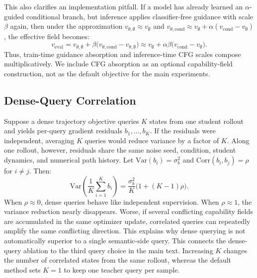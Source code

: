 \documentclass{llmxive}
\begin{document}
This also clarifies an implementation pitfall. If a model has already learned an $\alpha$-guided conditional branch, but inference applies classifier-free guidance with scale $\beta$ again, then under the approximation $v_{\theta,\emptyset}\approx v_{\emptyset}$ and $v_{\theta,\mathrm{cond}}\approx v_{\emptyset}+\alpha(v_{\mathrm{cond}}-v_{\emptyset})$, the effective field becomes:
\begin{equation}
  v_{\mathrm{eval}}
  =
  v_{\theta,\emptyset}
  +\beta\bigl(v_{\theta,\mathrm{cond}}-v_{\theta,\emptyset}\bigr)
  \approx
  v_{\emptyset}
  +\alpha\beta\bigl(v_{\mathrm{cond}}-v_{\emptyset}\bigr).
  \label{eq:app-cfg-compose}
\end{equation}
Thus, train-time guidance absorption and inference-time CFG scales compose multiplicatively. We include CFG absorption as an optional capability-field construction, not as the default objective for the main experiments.


\vspace{0.2cm}


\subsection{Dense-Query Correlation}
\label{app:dense-correlation}

Suppose a dense trajectory objective queries $K$ states from one student rollout and yields per-query gradient residuals $b_1,\ldots,b_K$. If the residuals were independent, averaging $K$ queries would reduce variance by a factor of $K$. Along one rollout, however, residuals share the same noise seed, condition, student dynamics, and numerical path history. Let $\mathrm{Var}(b_i)=\sigma_b^2$ and $\mathrm{Corr}(b_i,b_j)=\rho$ for $i\ne j$. Then:
\begin{equation}
  \mathrm{Var}\!\left(\frac{1}{K}\sum_{i=1}^K b_i\right)
  =
  \frac{\sigma_b^2}{K}\bigl(1+(K-1)\rho\bigr).
  \label{eq:app-corr-var}
\end{equation}
When $\rho\approx0$, dense queries behave like independent supervision. When $\rho\approx1$, the variance reduction nearly disappears. Worse, if several conflicting capability fields are accumulated in the same optimizer update, correlated queries can repeatedly amplify the same conflicting direction. This explains why dense querying is not automatically superior to a single semantic-side query. This connects the dense-query ablation to the third query choice in the main text. Increasing $K$ changes the number of correlated states from the same rollout, whereas the default method sets $K{=}1$ to keep one teacher query per sample.
\end{document}
